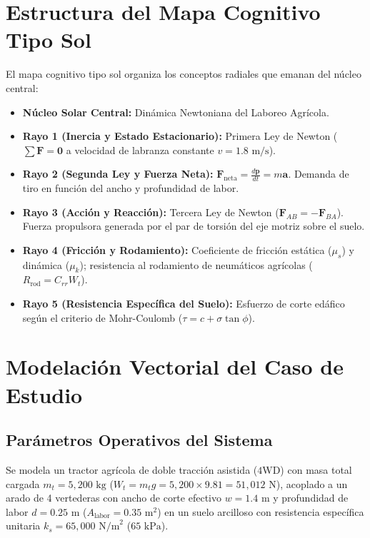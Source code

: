 \documentclass[spanish,letterpaper,oneside]{article}
\begin{document}
\section{Estructura del Mapa Cognitivo Tipo Sol}
El mapa cognitivo tipo sol organiza los conceptos radiales que emanan del núcleo central:
\begin{itemize}
    \item \textbf{Núcleo Solar Central:} Dinámica Newtoniana del Laboreo Agrícola.
    \item \textbf{Rayo 1 (Inercia y Estado Estacionario):} Primera Ley de Newton ($\sum \mathbf{F} = \mathbf{0}$ a velocidad de labranza constante $v = 1.8\text{ m/s}$).
    \item \textbf{Rayo 2 (Segunda Ley y Fuerza Neta):} $\mathbf{F}_{\text{neta}} = \frac{d\mathbf{p}}{dt} = m \mathbf{a}$. Demanda de tiro en función del ancho y profundidad de labor.
    \item \textbf{Rayo 3 (Acción y Reacción):} Tercera Ley de Newton ($\mathbf{F}_{AB} = -\mathbf{F}_{BA}$). Fuerza propulsora generada por el par de torsión del eje motriz sobre el suelo.
    \item \textbf{Rayo 4 (Fricción y Rodamiento):} Coeficiente de fricción estática ($\mu_s$) y dinámica ($\mu_k$); resistencia al rodamiento de neumáticos agrícolas ($R_{\text{rod}} = C_{rr} W_t$).
    \item \textbf{Rayo 5 (Resistencia Específica del Suelo):} Esfuerzo de corte edáfico según el criterio de Mohr-Coulomb ($\tau = c + \sigma \tan \phi$).
\end{itemize}

\section{Modelación Vectorial del Caso de Estudio}
\subsection{Parámetros Operativos del Sistema}
Se modela un tractor agrícola de doble tracción asistida ($4\text{WD}$) con masa total cargada $m_t = 5,200\text{ kg}$ ($W_t = m_t g = 5,200 \times 9.81 = 51,012\text{ N}$), acoplado a un arado de 4 vertederas con ancho de corte efectivo $w = 1.4\text{ m}$ y profundidad de labor $d = 0.25\text{ m}$ ($A_{\text{labor}} = 0.35\text{ m}^2$) en un suelo arcilloso con resistencia específica unitaria $k_s = 65,000\text{ N/m}^2$ ($65\text{ kPa}$).
\end{document}
